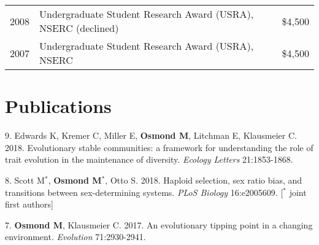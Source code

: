 \documentclass[12pt]{article}
\begin{document}
\begin{tabular}{llr}
  2008 & Undergraduate Student Research Award (USRA), NSERC (declined) & \$4,500\\
  2007 & Undergraduate Student Research Award (USRA), NSERC & \$4,500\\
\end{tabular}

\newpage
\section*{Publications}


\noindent\hspace{.1cm}9. Edwards K, Kremer C, Miller E, \textbf{Osmond M}, Litchman E, Klausmeier C. 2018. Evolutionary stable communities: a framework for understanding the role of trait evolution in the maintenance of diversity. \textit{Ecology Letters} 21:1853-1868.

\noindent\hspace{.1cm}8. Scott M$^*$, \textbf{Osmond M}$^*$, Otto S. 2018. Haploid selection, sex ratio bias, and transitions between sex-determining systems. \textit{PLoS Biology} 16:e2005609. [$^*$ joint first authors]

\noindent\hspace{.1cm}7. \textbf{Osmond M}, Klausmeier C. 2017. An evolutionary tipping point in a changing environment. \textit{Evolution} 71:2930-2941.
\end{document}
